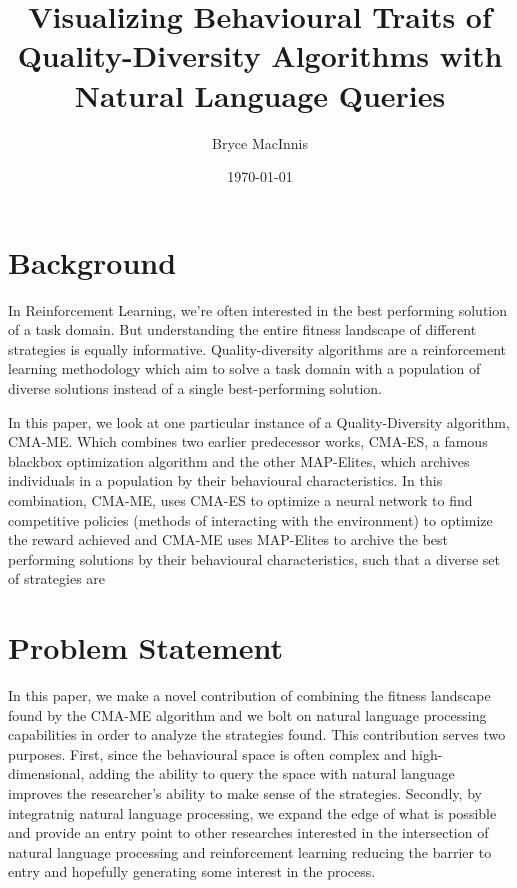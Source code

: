 \documentclass[11pt]{article}
\author{Bryce MacInnis}
\date{\today}
\title{Visualizing Behavioural Traits of Quality-Diversity Algorithms with Natural Language Queries}
\begin{document}
\maketitle
\section{Background}
\label{sec:org13e1f2e}

In Reinforcement Learning, we're often interested in the best performing solution of a task domain. But understanding the entire fitness landscape of different strategies
is equally informative. Quality-diversity algorithms are a reinforcement learning methodology which aim
to solve a task domain with a population of diverse solutions instead of a single best-performing solution.

In this paper, we look at one particular instance of a Quality-Diversity algorithm, CMA-ME.
Which combines two earlier predecessor works, CMA-ES, a famous blackbox optimization algorithm
and the other MAP-Elites, which archives individuals in a population by their behavioural characteristics.
In this combination, CMA-ME, uses CMA-ES to optimize a neural network to find competitive policies (methods
of interacting with the environment) to optimize the reward achieved and CMA-ME uses MAP-Elites to archive
the best performing solutions by their behavioural characteristics, such that a diverse set of strategies
are 

\section{Problem Statement}
\label{sec:orge903137}

In this paper, we make a novel contribution of combining the fitness landscape found by the CMA-ME algorithm
and we bolt on natural language processing capabilities in order to analyze the strategies found.
This contribution serves two purposes. First, since the behavioural space is often complex and high-dimensional,
adding the ability to query the space with natural language improves the researcher's ability to make sense of the
strategies. Secondly, by integratnig natural language processing, we expand the edge of what is possible and provide
an entry point to other researches interested in the intersection of natural language processing and reinforcement learning
reducing the barrier to entry and hopefully generating some interest in the process.
\end{document}
